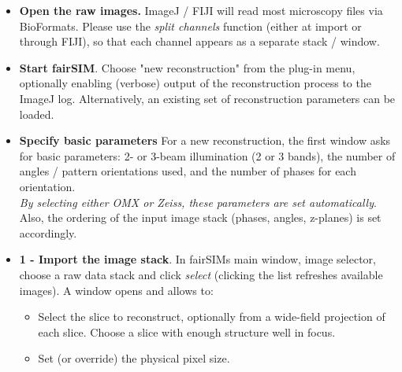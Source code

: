 \documentclass[twoside=false,
           twocolumn=false,
           a4paper,DIV=15,
           10pt]{scrartcl}
\begin{document}
\begin{itemize}
\item \textbf{Open the raw images.} ImageJ / FIJI will
read most microscopy files via BioFormats. Please use
the \emph{split channels} function (either at import
or through FIJI), so that each channel appears as a separate
stack / window.
\item 
\textbf{Start fairSIM}. Choose "new reconstruction"
from the plug-in menu, optionally enabling (verbose) output
of the reconstruction process to the ImageJ log. Alternatively,
an existing set of reconstruction parameters can be loaded.
\item
\begin{minipage}[t]{.55\textwidth}
\textbf{Specify basic parameters}
For a new reconstruction, the first window asks for
basic parameters: 2- or 3-beam 
illumination (2 or 3 bands), the number of 
angles / pattern orientations
used, and the number of phases for each orientation.\\
\emph{By selecting either OMX or Zeiss, these parameters
are set automatically}. 
Also, the ordering of the input image
stack (phases, angles, z-planes) is set accordingly.
\end{minipage}\hfill
\begin{minipage}[t]{.25\textwidth}
\end{minipage}
\item \textbf{1 - Import the image stack}. In fairSIMs main window,
image selector, choose a raw data stack and click \emph{select}
(clicking the list refreshes available images).
A window opens and allows to:
\begin{itemize}
\item Select the slice to reconstruct, optionally from a wide-field
projection of each slice.
Choose a slice with enough structure well in focus.
\item Set (or override) the physical pixel size.

\end{itemize}
\end{itemize}
\end{document}
